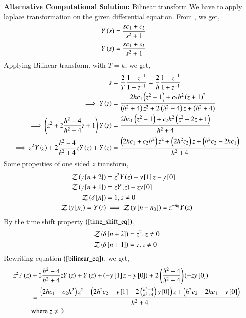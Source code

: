 \documentclass[journal]{IEEEtran}
\begin{document}
\textbf{Alternative Computational Solution:} Bilinear transform 
\newline
We have to apply laplace transformation on the given differential equation. From \brak{\ref{laplace_eq}}, we get,
\begin{align}
    Y\left(s\right) &= \frac{sc_1 + c_2}{s^2 + 1}
\end{align}
\begin{align}
    Y\left(s\right) &= \frac{sc_1 + c_2}{s^2 + 1}
\end{align}
Applying Bilinear transform, with $T = h$, we get,
\begin{align}
    s &= \frac{2}{T}\frac{1 - z^{-1}}{1 + z^{-1}} = \frac{2}{h}\frac{1 - z^{-1}}{1 + z^{-1}}\\
    \implies Y\left(z\right) &= \frac{2hc_1 \left(z^2 - 1\right) + c_2h^2 \left(z + 1\right)^2}{\left(h^2 + 4\right)z^2 + 2\left(h^2 - 4\right)z + \left(h^2 + 4\right)}\\
    \implies \left(z^2 + 2\frac{h^2 - 4}{h^2 + 4}z + 1\right) Y\left(z\right) &= \frac{2hc_1 \left(z^2 - 1\right) + c_2h^2 \left(z^2 + 2z + 1\right)}{h^2 + 4}\\
    \implies z^2Y\left(z\right) + 2\frac{h^2 - 4}{h^2 + 4}zY\left(z\right) + Y\left(z\right) &= \frac{\left(2h c_1 + c_2 h^2\right)z^2 + \left(2h^2 c_2\right)z + \left(h^2c_2 - 2hc_1\right)}{h^2 + 4} \label{bilinear_eq}
\end{align}
Some properties of one sided $z$ transform,
\begin{align}
    \mathcal{Z}\brak{y\sbrak{n + 2}} &= z^2 Y\brak{z} - y\sbrak{1}z - y\sbrak{0}\\
    \mathcal{Z}\brak{y\sbrak{n + 1}} &= z Y\brak{z} - z y_\sbrak{0}\\
    \mathcal{Z}\brak{\delta\sbrak{n}} &= 1 \text{, } z \neq 0\\
    \mathcal{Z}\brak{y\sbrak{n}} = Y\brak{z} &\implies \mathcal{Z}\brak{y\sbrak{n - n_0}} = z^{-n_0}Y\brak{z} \label{time_shift_eq}
\end{align}
By the time shift property $\left(\ref{time_shift_eq}\right)$,
\begin{align}
    \mathcal{Z}\left(\delta{}\left[n + 2\right]\right) &= z^2 \text{, } z \neq 0\\
    \mathcal{Z}\left(\delta{}\left[n + 1\right]\right) &= z \text{, } z \neq 0
\end{align}
Rewriting equation $\left(\ref{bilinear_eq}\right)$, we get,
\begin{align}
    z^2Y\left(z\right) &+ 2\frac{h^2 - 4}{h^2 + 4}zY\left(z\right) + Y\left(z\right) + \left(- y{}\left[1\right]z - y{}\left[0\right]\right) + 2\left(\frac{h^2 - 4}{h^2 + 4}\right)\left(-zy{}\left[0\right]\right) \nonumber\\
    &= \frac{\left(2h c_1 + c_2 h^2\right)z^2 + \left(2h^2 c_2 - y{}\left[1\right] - 2\left(\frac{h^2 - 4}{h^2 + 4}\right)y{}\left[0\right]\right)z + \left(h^2c_2 - 2hc_1 - y{}\left[0\right]\right)}{h^2 + 4} \label{z_trans_eq}\\
    &\text{where } z \neq 0
\end{align}
\end{document}
